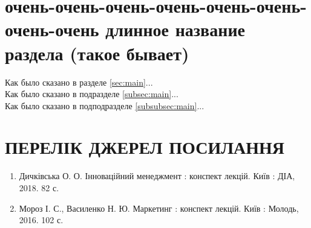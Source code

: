 \documentclass[a4paper, 14pt]{article}
\begin{document}
\section{очень-очень-очень-очень-очень-очень-очень-очень длинное название раздела (такое бывает)}
Как было сказано в разделе \ref{sec:main}...\\
Как было сказано в подразделе \ref{subsec:main}...\\
Как было сказано в подподразделе \ref{subsubsec:main}...\\

\section*{ПЕРЕЛІК ДЖЕРЕЛ ПОСИЛАННЯ}
\begin{enumerate}
    \item Дичківська О. О. Інноваційний менеджмент : конспект лекцій. Київ :
ДІА, 2018. 82 с.
    \item Мороз І. С., Василенко Н. Ю. Маркетинг : конспект лекцій. Київ :
Молодь, 2016. 102 с.
\end{enumerate}
\end{document}
